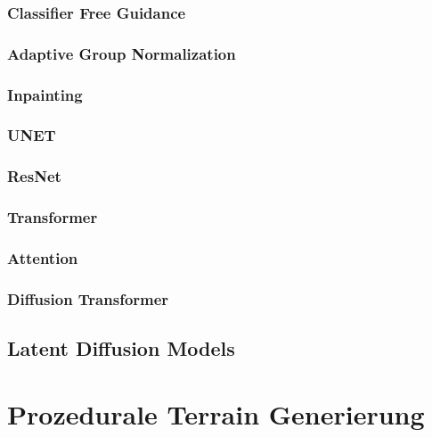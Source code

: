 \subsubsection{Classifier Free Guidance}

\subsubsection{Adaptive Group Normalization}

\subsubsection{Inpainting}

\subsubsection{UNET}

\subsubsection{ResNet}

\subsubsection{Transformer}

\subsubsection{Attention}

\subsubsection{Diffusion Transformer}


\subsection{Latent Diffusion Models}



\section{Prozedurale Terrain Generierung}

